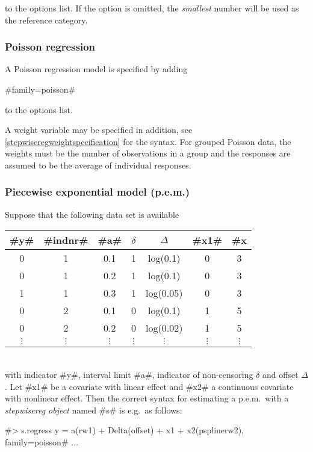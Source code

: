 to the options list. If the option is omitted, the {\em smallest}
number will be used as the reference category.


\subsubsection*{Poisson regression}

A Poisson regression model is specified by adding

#family=poisson#

to the options list.

A weight variable may be specified in addition, see
\autoref{stepwiseregweightspecification} for the syntax. For grouped Poisson
data, the weights must be the number of observations in a group and
the responses are assumed to be the average of individual responses.


\subsubsection*{Piecewise exponential model
(p.e.m.)}

Suppose that the following data set is available
\vspace{0.5cm}\\
\begin{tabular}{c|c|c|c|c|c|c}
#y# & #indnr# & #a# & $\delta$ &  $\Delta$ &   #x1# &
#x#2\\\hline\hline
0 &  1 &   0.1 &   1  &  log(0.1) & 0  & 3\\
0  & 1   & 0.2  &  1  &  log(0.1) & 0 &  3\\
1  & 1   & 0.3  &  1  &  log(0.05)& 0  & 3\\\hline
0 &  2 &   0.1 &   0 &   log(0.1) & 1 &  5\\
0  & 2  &  0.2 &   0  &  log(0.02)& 1 &  5\\\hline
$\vdots$ & $\vdots$ & $\vdots$ & $\vdots$ & $\vdots$ & $\vdots$& $\vdots$\\
\end{tabular}
\vspace{0.5cm}\\
with indicator #y#, interval limit #a#, indicator of non-censoring
$\delta$ and offset $\Delta$. Let #x1# be a
covariate with linear effect and #x2# a continuous covariate with
nonlinear effect. Then the correct syntax for estimating a
p.e.m.~with a {\em stepwisereg object} named #s# is e.g.~as follows:

 #> s.regress y = a(rw1) + Delta(offset) + x1 + x2(psplinerw2), family=poisson# $\ldots$

